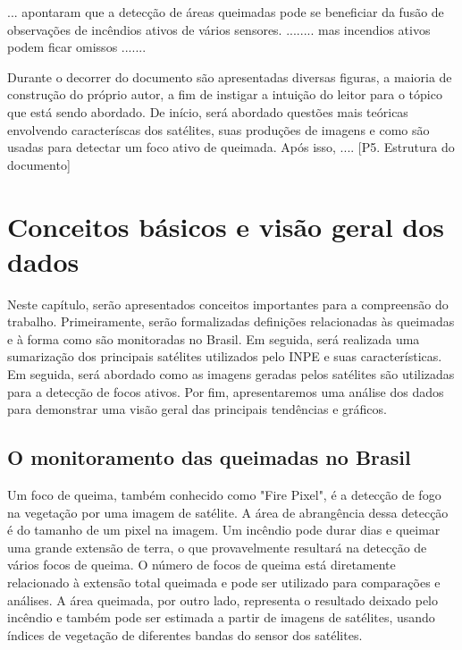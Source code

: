 \documentclass[cic,tc]{iiufrgs}
\begin{document}
... apontaram que a detecção de áreas queimadas pode se beneficiar da fusão de observações de incêndios ativos de vários sensores. \citep{giglio2010assessing} ........ mas incendios ativos podem ficar omissos \citep{giglio2009active} ....... \par

Durante o decorrer do documento são apresentadas diversas figuras, a maioria de construção do próprio autor, a fim de instigar a intuição do leitor para o tópico que está sendo abordado. De início, será abordado questões mais teóricas envolvendo caracteríscas dos satélites, suas produções de imagens e como são usadas para detectar um foco ativo de queimada. Após isso, .... [P5. Estrutura do documento] \par



\chapter{Conceitos básicos e visão geral dos dados}

Neste capítulo, serão apresentados conceitos importantes para a compreensão do trabalho. Primeiramente, serão formalizadas definições relacionadas às queimadas e à forma como são monitoradas no Brasil. Em seguida, será realizada uma sumarização dos principais satélites utilizados pelo INPE e suas características. Em seguida, será abordado como as imagens geradas pelos satélites são utilizadas para a detecção de focos ativos. Por fim, apresentaremos uma análise dos dados para demonstrar uma visão geral das principais tendências e gráficos. \par

\section{O monitoramento das queimadas no Brasil}

Um foco de queima, também conhecido como "Fire Pixel", é a detecção de fogo na vegetação por uma imagem de satélite. A área de abrangência dessa detecção é do tamanho de um pixel na imagem. Um incêndio pode durar dias e queimar uma grande extensão de terra, o que provavelmente resultará na detecção de vários focos de queima. O número de focos de queima está diretamente relacionado à extensão total queimada e pode ser utilizado para comparações e análises. A área queimada, por outro lado, representa o resultado deixado pelo incêndio e também pode ser estimada a partir de imagens de satélites, usando índices de vegetação de diferentes bandas do sensor dos satélites. \par
\end{document}
